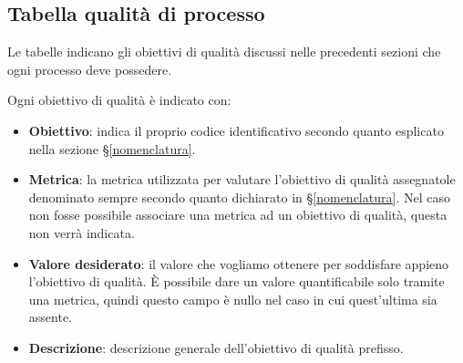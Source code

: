 \subsection{Tabella qualità di processo}
Le tabelle indicano gli obiettivi di qualità discussi nelle precedenti sezioni che ogni processo deve possedere.

Ogni obiettivo di qualità è indicato con:

\begin{itemize}
	\item \textbf{Obiettivo}: indica il proprio codice identificativo secondo quanto esplicato nella sezione \S\ref{nomenclatura}.
	\item \textbf{Metrica}: la metrica utilizzata per valutare l'obiettivo di qualità assegnatole denominato sempre secondo quanto dichiarato in \S\ref{nomenclatura}. Nel caso non fosse possibile associare una metrica ad un obiettivo di qualità, questa non verrà indicata.
	\item \textbf{Valore desiderato}: il valore che vogliamo ottenere per soddisfare appieno l'obiettivo di qualità. È possibile dare un valore quantificabile solo tramite una metrica, quindi questo campo è nullo nel caso in cui quest'ultima sia assente.
	\item \textbf{Descrizione}: descrizione generale dell'obiettivo di qualità prefisso.
\end{itemize}

\newcommand{\grigiodesc}{gray!15}

